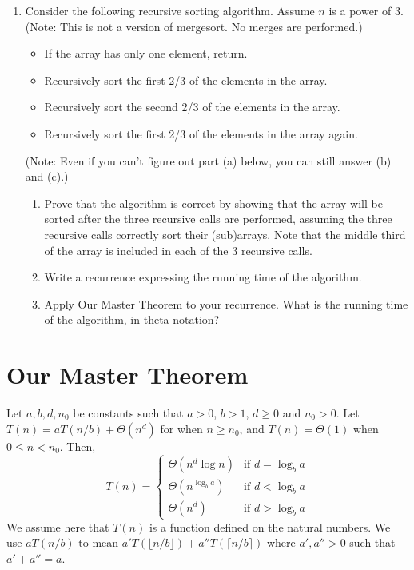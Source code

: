\documentclass{article}
\begin{document}
\begin{enumerate}
    \item Consider the following recursive sorting algorithm. Assume $n$ is a power of 3. (Note: This is not a version of mergesort. No merges are performed.)
    \begin{itemize}
        \item If the array has only one element, return.
        \item Recursively sort the first 2/3 of the elements in the array.
        \item Recursively sort the second 2/3 of the elements in the array.
        \item Recursively sort the first 2/3 of the elements in the array again.
    \end{itemize}
    (Note: Even if you can’t figure out part (a) below, you can still answer (b) and (c).)
    \begin{enumerate}
        \item Prove that the algorithm is correct by showing that the array will be sorted after the three recursive calls are performed, assuming the three recursive calls correctly sort their (sub)arrays. Note that the middle third of the array is included in each of the 3 recursive calls.
        \item Write a recurrence expressing the running time of the algorithm.
        \item Apply Our Master Theorem to your recurrence. What is the running time of the algorithm, in theta notation?
    \end{enumerate}
\end{enumerate}

\section*{Our Master Theorem}

\begin{theorem}
Let $a, b, d, n_0$ be constants such that $a > 0$, $b > 1$, $d \ge 0$ and $n_0 > 0$. Let $T(n) = aT(n/b) + \Theta(n^d)$ for when $n \ge n_0$, and $T(n) = \Theta(1)$ when $0 \le n < n_0$. Then,
\[
T(n) = \begin{cases}
\Theta(n^d \log n) & \text{if } d = \log_b a \\
\Theta(n^{\log_b a}) & \text{if } d < \log_b a \\
\Theta(n^d) & \text{if } d > \log_b a
\end{cases}
\]
We assume here that $T(n)$ is a function defined on the natural numbers. We use $aT(n/b)$ to mean $a'T(\lfloor n/b \rfloor) + a''T(\lceil n/b \rceil)$ where $a', a'' > 0$ such that $a' + a'' = a$.
\end{theorem}
\end{document}
